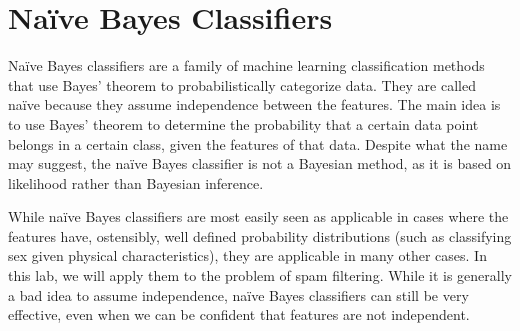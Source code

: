 


\section*{Naïve Bayes Classifiers}
Naïve Bayes classifiers are a family of machine learning classification methods that use Bayes' theorem to probabilistically categorize data.
They are called naïve because they assume independence between the features.
The main idea is to use Bayes' theorem to determine the probability that a certain data point belongs in a certain class, given the features of that data.
Despite what the name may suggest, the naïve Bayes classifier is not a Bayesian method, as it is based on likelihood rather than Bayesian inference.

While naïve Bayes classifiers are most easily seen as applicable in cases where the features have, ostensibly, well defined probability distributions (such as classifying sex given physical characteristics), they are applicable in many other cases.
In this lab, we will apply them to the problem of spam filtering.
While it is generally a bad idea to assume independence, naïve Bayes classifiers can still be very effective, even when we can be confident that features are not independent.

